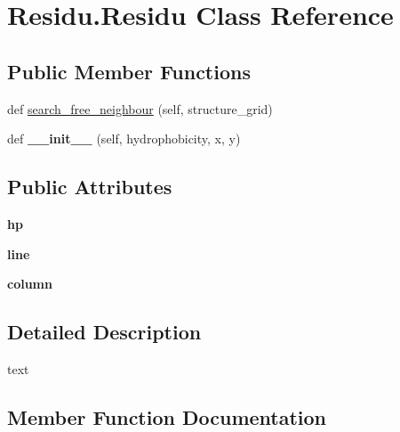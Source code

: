 \hypertarget{classResidu_1_1Residu}{}\section{Residu.\+Residu Class Reference}
\label{classResidu_1_1Residu}
\subsection*{Public Member Functions}
\begin{DoxyCompactItemize}
\item 
def \hyperlink{classResidu_1_1Residu_a2c2303a44077b9baff5d95cf80de3619}{search\+\_\+free\+\_\+neighbour} (self, structure\+\_\+grid)
\item 
\mbox{\label{classResidu_1_1Residu_a07b258a1c699616ec59d4224283b398d}} 
def {\bfseries \+\_\+\+\_\+init\+\_\+\+\_\+} (self, hydrophobicity, x, y)
\end{DoxyCompactItemize}
\subsection*{Public Attributes}
\begin{DoxyCompactItemize}
\item 
\mbox{\label{classResidu_1_1Residu_af778501a86dc7d49803784c36fadecaf}} 
{\bfseries hp}
\item 
\mbox{\label{classResidu_1_1Residu_a52fde1932f96aac85f7fc3085ecf2409}} 
{\bfseries line}
\item 
\mbox{\label{classResidu_1_1Residu_a8f226a0502f5490c82c0a01c10bfcb01}} 
{\bfseries column}
\end{DoxyCompactItemize}


\subsection{Detailed Description}
\begin{DoxyVerb}text
\end{DoxyVerb}
 

\subsection{Member Function Documentation}
\mbox{\label{classResidu_1_1Residu_a2c2303a44077b9baff5d95cf80de3619}} 
